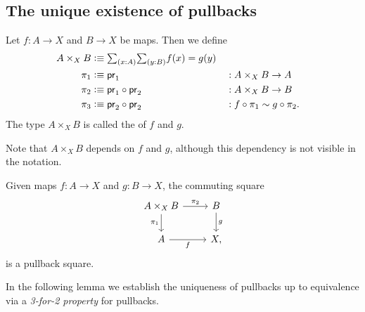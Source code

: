 \subsection{The unique existence of pullbacks}

\begin{defn}
Let $f:A\to X$ and $B\to X$ be maps. Then we define
\begin{align*}
A\times_X B & \defeq \sm{x:A}{y:B}f(x)=g(y) \\
\pi_1 & \defeq \proj 1 & & : A\times_X B\to A \\
\pi_2 & \defeq \proj 1\circ\proj 2 & & : A\times_X B\to B\\
\pi_3 & \defeq \proj 2\circ\proj 2 & & : f\circ \pi_1 \htpy g\circ\pi_2.
\end{align*}
The type $A\times_X B$ is called the  of $f$ and $g$.
\end{defn}

Note that $A\times_X B$ depends on $f$ and $g$, although this dependency is not visible in the notation.

\begin{prp}
Given maps $f:A\to X$ and $g:B\to X$, the commuting square
\begin{equation*}
\begin{tikzcd}
A\times_X B \arrow[r,"\pi_2"] \arrow[d,swap,"\pi_1"] & B \arrow[d,"g"] \\
A \arrow[r,swap,"f"] & X,
\end{tikzcd}
\end{equation*}
is a pullback square.
\end{prp}

In the following lemma we establish the uniqueness of pullbacks up to equivalence via a \emph{3-for-2 property} for pullbacks.


